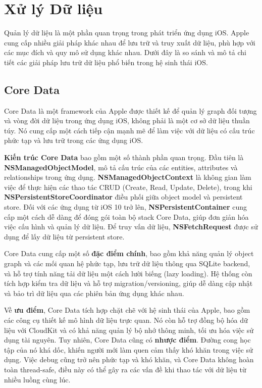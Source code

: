 \section{Xử lý Dữ liệu}

\hspace*{0.8cm}Quản lý dữ liệu là một phần quan trọng trong phát triển ứng dụng iOS. Apple cung cấp nhiều giải pháp khác nhau để lưu trữ và truy xuất dữ liệu, phù hợp với các mục đích và quy mô sử dụng khác nhau. Dưới đây là so sánh và mô tả chi tiết các giải pháp lưu trữ dữ liệu phổ biến trong hệ sinh thái iOS.


\subsection{Core Data}
Core Data \cite{Core-Data} là một framework của Apple được thiết kế để quản lý graph đối tượng và vòng đời dữ liệu trong ứng dụng iOS, không phải là một cơ sở dữ liệu thuần túy. Nó cung cấp một cách tiếp cận mạnh mẽ để làm việc với dữ liệu có cấu trúc phức tạp và lưu trữ trong các ứng dụng iOS.

\textbf{Kiến trúc Core Data} bao gồm một số thành phần quan trọng. Đầu tiên là \textbf{NSManagedObjectModel}, mô tả cấu trúc của các entities, attributes và relationships trong ứng dụng. \textbf{NSManagedObjectContext} là không gian làm việc để thực hiện các thao tác CRUD (Create, Read, Update, Delete), trong khi \textbf{NSPersistentStoreCoordinator} điều phối giữa object model và persistent store. Đối với các ứng dụng từ iOS 10 trở lên, \textbf{NSPersistentContainer} cung cấp một cách dễ dàng để đóng gói toàn bộ stack Core Data, giúp đơn giản hóa việc cấu hình và quản lý dữ liệu. Để truy vấn dữ liệu, \textbf{NSFetchRequest} được sử dụng để lấy dữ liệu từ persistent store.

Core Data cung cấp một số \textbf{đặc điểm chính}, bao gồm khả năng quản lý object graph và các mối quan hệ phức tạp, lưu trữ dữ liệu thông qua SQLite backend, và hỗ trợ tính năng tải dữ liệu một cách lười biếng (lazy loading). Hệ thống còn tích hợp kiểm tra dữ liệu và hỗ trợ migration/versioning, giúp dễ dàng cập nhật và bảo trì dữ liệu qua các phiên bản ứng dụng khác nhau.

Về \textbf{ưu điểm}, Core Data tích hợp chặt chẽ với hệ sinh thái của Apple, bao gồm các công cụ thiết kế mô hình dữ liệu trực quan. Nó còn hỗ trợ đồng bộ hóa dữ liệu với CloudKit và có khả năng quản lý bộ nhớ thông minh, tối ưu hóa việc sử dụng tài nguyên.
Tuy nhiên, Core Data cũng có \textbf{nhược điểm}. Đường cong học tập của nó khá dốc, khiến người mới làm quen cảm thấy khó khăn trong việc sử dụng. Việc debug cũng trở nên phức tạp và khó khăn, và Core Data không hoàn toàn thread-safe, điều này có thể gây ra các vấn đề khi thao tác với dữ liệu từ nhiều luồng cùng lúc.

